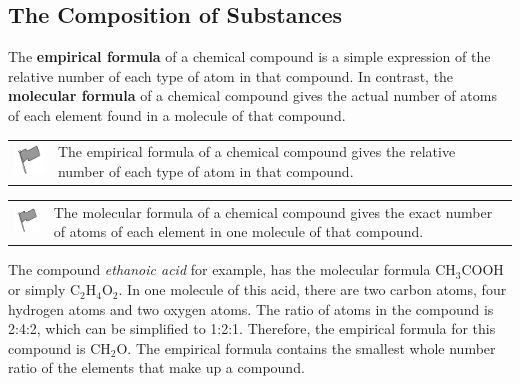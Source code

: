             \subsection{ The Composition of Substances}
            \nopagebreak
      \label{m38712*id280317}The \textbf{empirical formula} of a chemical compound is a simple expression of the relative number of each type of atom in that compound. In contrast, the \textbf{molecular formula} of a chemical compound gives the actual number of atoms of each element found in a molecule of that compound.\par 
\label{m38712*fhsst!!!underscore!!!id885}\begin{definition}
	  \begin{tabular*}{15 cm}{m{15 mm}m{}}
	\hspace*{-50pt}  \includegraphics[width=0.5in]{col11305.imgs/psflag2.png}   & \Definition{   \label{id2501853}\textbf{ Empirical formula }} { \label{m38712*meaningfhsst!!!underscore!!!id885}
      \label{m38712*id280341}The empirical formula of a chemical compound gives the relative number of each type of atom in that compound. \par 
       } 
      \end{tabular*}
      \end{definition}
\label{m38712*fhsst!!!underscore!!!id888}\begin{definition}
	  \begin{tabular*}{15 cm}{m{15 mm}m{}}
	\hspace*{-50pt}  \includegraphics[width=0.5in]{col11305.imgs/psflag2.png}   & \Definition{   \label{id2501878}\textbf{ Molecular formula }} { \label{m38712*meaningfhsst!!!underscore!!!id888}
      \label{m38712*id280360}The molecular formula of a chemical compound gives the exact number of atoms of each element in one molecule of that compound. \par 
       } 
      \end{tabular*}
      \end{definition}
      \label{m38712*id280372}The compound \textsl{ethanoic acid} for example, has the molecular formula $\mathrm{CH}{}_{3}\mathrm{COOH}$ or simply $\mathrm{C}{}_{2}\mathrm{H}{}_{4}\mathrm{O}{}_{2}$. In one molecule of this acid, there are two carbon atoms, four hydrogen atoms and two oxygen atoms. The ratio of atoms in the compound is 2:4:2, which can be simplified to 1:2:1. Therefore, the empirical formula for this compound is $\mathrm{CH}{}_{2}\mathrm{O}$. The empirical formula contains the smallest whole number ratio of the elements that make up a compound.\par 
